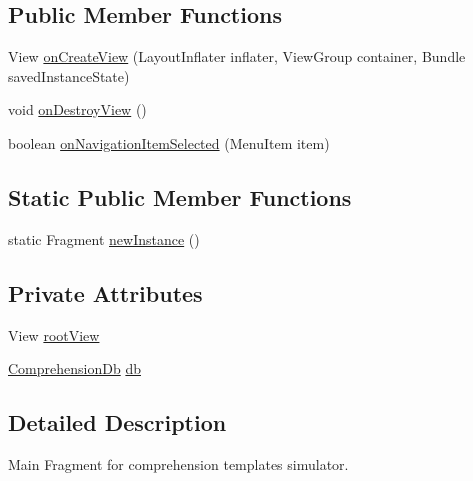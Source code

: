 \subsection*{Public Member Functions}
\begin{DoxyCompactItemize}
\item 
View \hyperlink{classorg_1_1buildmlearn_1_1toolkit_1_1comprehensiontemplate_1_1fragment_1_1MainFragment_a5f370e2dcdb91b65e4acbb208f5293fb}{on\+Create\+View} (Layout\+Inflater inflater, View\+Group container, Bundle saved\+Instance\+State)
\item 
void \hyperlink{classorg_1_1buildmlearn_1_1toolkit_1_1comprehensiontemplate_1_1fragment_1_1MainFragment_a10623acda397a6b9030ba76462cbd39f}{on\+Destroy\+View} ()
\item 
boolean \hyperlink{classorg_1_1buildmlearn_1_1toolkit_1_1comprehensiontemplate_1_1fragment_1_1MainFragment_a1161d8ec17f2bc54f95a555892b7b85d}{on\+Navigation\+Item\+Selected} (Menu\+Item item)
\end{DoxyCompactItemize}
\subsection*{Static Public Member Functions}
\begin{DoxyCompactItemize}
\item 
static Fragment \hyperlink{classorg_1_1buildmlearn_1_1toolkit_1_1comprehensiontemplate_1_1fragment_1_1MainFragment_a5a302391e9dee6256bad5ebc5cef8714}{new\+Instance} ()
\end{DoxyCompactItemize}
\subsection*{Private Attributes}
\begin{DoxyCompactItemize}
\item 
View \hyperlink{classorg_1_1buildmlearn_1_1toolkit_1_1comprehensiontemplate_1_1fragment_1_1MainFragment_a72ee5c1b3b5d1c3c3238cab8aeef863f}{root\+View}
\item 
\hyperlink{classorg_1_1buildmlearn_1_1toolkit_1_1comprehensiontemplate_1_1data_1_1ComprehensionDb}{Comprehension\+Db} \hyperlink{classorg_1_1buildmlearn_1_1toolkit_1_1comprehensiontemplate_1_1fragment_1_1MainFragment_aaebe63b8fbab0ea9a7f53996543cbdcf}{db}
\end{DoxyCompactItemize}


\subsection{Detailed Description}
Main Fragment for comprehension template\textquotesingle{}s simulator. 

